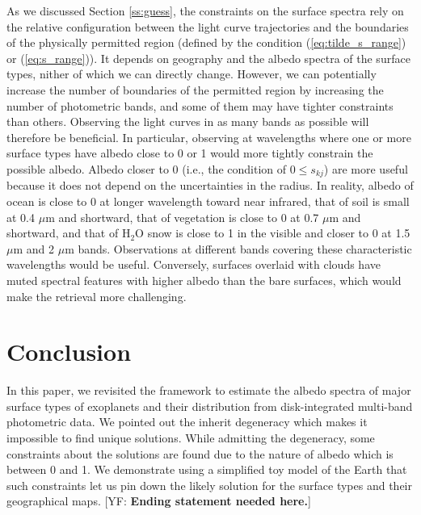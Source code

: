 \documentclass[iop,numberedappendix,apj,]{emulateapj}
\def\memoYF#1{\color{red}[YF: {\bf #1}]\color{black}}
\begin{document}
As we discussed Section \ref{ss:guess}, the constraints on the surface spectra rely on the relative configuration between the light curve trajectories and the boundaries of the physically permitted region (defined by the condition (\ref{eq:tilde_s_range}) or (\ref{eq:s_range})). 
It depends on geography and the albedo spectra of the surface types, nither of which we can directly change. 
However, we can potentially increase the number of boundaries of the permitted region by increasing the number of photometric bands, and some of them may have tighter constraints than others. 
Observing the light curves in as many bands as possible will therefore be beneficial.  
In particular, observing at wavelengths where one or more surface types have albedo close to 0 or 1 would more tightly constrain the possible albedo. 
Albedo closer to 0 (i.e., the condition of $0 \le s_{kj}$) are more useful because it does not depend on the uncertainties in the radius. 
In reality, albedo of ocean is close to 0 at longer wavelength toward near infrared, that of soil is small at 0.4 $\mu $m and shortward, that of vegetation is close to 0 at 0.7 $\mu$m and shortward, and that of H$_2$O snow is close to 1 in the visible and closer to 0 at 1.5 $\mu$m and 2 $\mu$m bands. 
Observations at different bands covering these characteristic wavelengths would be useful. 
Conversely, surfaces overlaid with clouds have muted spectral features with higher albedo than the bare surfaces, which would make the retrieval more challenging. 





\section{Conclusion}
\label{s:conclusion}

In this paper, we revisited the framework to estimate the albedo spectra of major surface types of exoplanets and their distribution from disk-integrated multi-band photometric data. 
We pointed out the inherit degeneracy which makes it impossible to find unique solutions. 
While admitting the degeneracy, some constraints about the solutions are found due to the nature of albedo which is between 0 and 1. 
We demonstrate using a simplified toy model of the Earth that such constraints let us pin down the likely solution for the surface types and their geographical maps. 
\memoYF{Ending statement needed here.}
\end{document}
